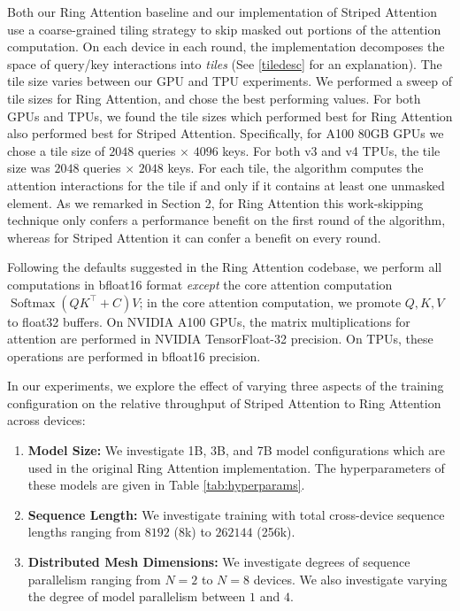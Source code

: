 Both our Ring Attention baseline and our implementation of Striped Attention use a coarse-grained tiling strategy to skip masked out portions of the attention computation. On each device in each round, the implementation decomposes the space of query/key interactions into \textit{tiles} (See \ref{tiledesc}  for an explanation). The tile size varies between our GPU and TPU experiments. We performed a sweep of tile sizes for Ring Attention, and chose the best performing values. For both GPUs and TPUs, we found the tile sizes which performed best for Ring Attention also performed best for Striped Attention. Specifically, for A100 80GB GPUs we chose a tile size of $2048$ queries $\times$ $4096$ keys. For both v3 and v4 TPUs, the tile size was $2048$ queries $\times$ $2048$ keys. For each tile, the algorithm computes the attention interactions for the tile if and only if it contains at least one unmasked element. As we remarked in Section 2, for Ring Attention this work-skipping technique only confers a performance benefit on the first round of the algorithm, whereas for Striped Attention it can confer a benefit on every round.

Following the defaults suggested in the Ring Attention codebase, we perform all computations in bfloat16 format \emph{except} the core attention computation $\operatorname{Softmax}(Q K^\top + C) V$; in the core attention computation, we promote $Q, K, V$ to float32 buffers. On NVIDIA A100 GPUs,  the matrix multiplications for attention are performed in NVIDIA TensorFloat-32 precision. On TPUs, these operations are performed in bfloat16 precision.

In our experiments, we explore the effect of varying three aspects of the training configuration on the relative throughput of Striped Attention to Ring Attention across devices:

\begin{enumerate}[label=(\arabic*), noitemsep, topsep=0pt]
    \item \textbf{Model Size:} We investigate 1B, 3B, and 7B model configurations which are used in the original Ring Attention implementation. The hyperparameters of these models are given in Table \ref{tab:hyperparams}.
    \item \textbf{Sequence Length:} We investigate training with total cross-device sequence lengths ranging from $8192$ (8k) to $262144$ (256k).
    \item \textbf{Distributed Mesh Dimensions:} We investigate degrees of sequence parallelism ranging from $N = 2$ to $N = 8$ devices. We also investigate varying the degree of model parallelism \cite{megatronlm} between $1$ and $4$.
\end{enumerate}

